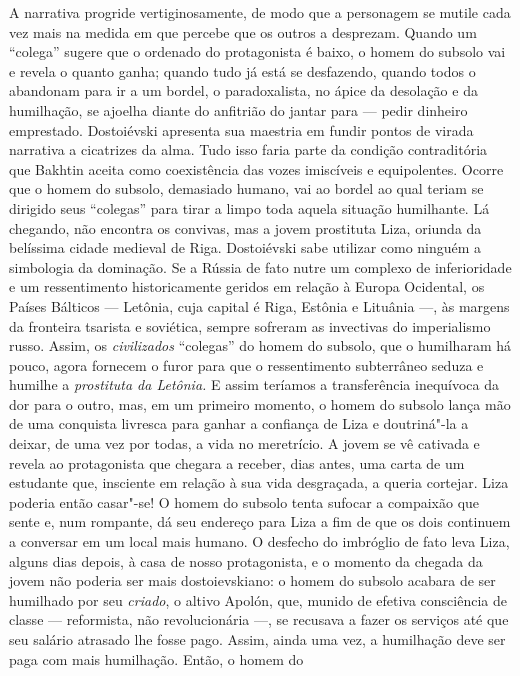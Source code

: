 A narrativa progride vertiginosamente, de modo que a personagem se
mutile cada vez mais na medida em que percebe que os outros a desprezam.
Quando um ``colega'' sugere que o ordenado do protagonista é baixo, o
homem do subsolo vai e revela o quanto ganha; quando tudo já está se
desfazendo, quando todos o abandonam para ir a um bordel, o
paradoxalista, no ápice da desolação e da humilhação, se ajoelha diante
do anfitrião do jantar para --- pedir dinheiro emprestado. Dostoiévski
apresenta sua maestria em fundir pontos de virada narrativa a cicatrizes
da alma. Tudo isso faria parte da condição contraditória que Bakhtin
aceita como coexistência das vozes imiscíveis e equipolentes. Ocorre que
o homem do subsolo, demasiado humano, vai ao bordel ao qual teriam se
dirigido seus ``colegas'' para tirar a limpo toda aquela situação
humilhante. Lá chegando, não encontra os convivas, mas a jovem
prostituta Liza, oriunda da belíssima cidade medieval de Riga.
Dostoiévski sabe utilizar como ninguém a simbologia da dominação. Se a
Rússia de fato nutre um complexo de inferioridade e um ressentimento
historicamente geridos em relação à Europa Ocidental, os Países Bálticos
--- Letônia, cuja capital é Riga, Estônia e Lituânia ---, às margens da
fronteira tsarista e soviética, sempre sofreram as invectivas do
imperialismo russo. Assim, os \emph{civilizados} ``colegas'' do homem do
subsolo, que o humilharam há pouco, agora fornecem o furor para que o
ressentimento subterrâneo seduza e humilhe a \emph{prostituta da
Letônia.} E assim teríamos a transferência inequívoca da dor para o
outro, mas, em um primeiro momento, o homem do subsolo lança mão de uma
conquista livresca para ganhar a confiança de Liza e doutriná"-la a
deixar, de uma vez por todas, a vida no meretrício. A jovem se vê
cativada e revela ao protagonista que chegara a receber, dias antes, uma
carta de um estudante que, insciente em relação à sua vida desgraçada, a
queria cortejar. Liza poderia então casar"-se! O homem do subsolo tenta
sufocar a compaixão que sente e, num rompante, dá seu endereço para Liza
a fim de que os dois continuem a conversar em um local mais humano. O
desfecho do imbróglio de fato leva Liza, alguns dias depois, à casa de
nosso protagonista, e o momento da chegada da jovem não poderia ser mais
dostoievskiano: o homem do subsolo acabara de ser humilhado por seu
\emph{criado}, o altivo Apolón, que, munido de efetiva consciência de
classe --- reformista, não revolucionária ---, se recusava a fazer os
serviços até que seu salário atrasado lhe fosse pago. Assim, ainda uma
vez, a humilhação deve ser paga com mais humilhação. Então, o homem do
